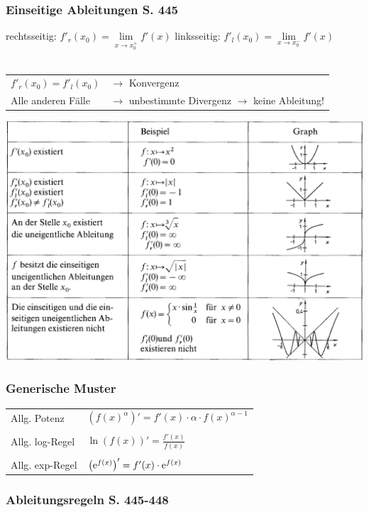 			
			\subsubsection{Einseitige Ableitungen S. 445}
			rechtsseitig: $f'_r(x_0) = \lim\limits_{x \to x_0^+}f'(x)$ \quad
			linksseitig: $f'_l(x_0) = \lim\limits_{x \to x_0^-}f'(x)$ \\
			\\
			\begin{tabular}{ll}
			$f'_r(x_0) = f'_l(x_0)$ & $\rightarrow$ Konvergenz \\
			Alle anderen Fälle & $\rightarrow$ unbestimmte Divergenz $\rightarrow$ keine Ableitung! \\
			\end{tabular}
			
			

		\includegraphics[width=0.9\linewidth]{Bilder/konvergenz-divergenz}
			
			
			\subsubsection{Generische Muster}
			\begin{tabular}{ll}
			Allg. Potenz &  $\left( f(x)^\alpha \right)' = f'(x) \cdot \alpha \cdot f(x) ^{\alpha - 1} $ \\
			\\
			Allg. log-Regel & $\ln \left( f(x) \right)' = \frac{f'(x)}{f(x)} $ \\
			\\
			Allg. exp-Regel & $ \left( \mathrm{e}^{f(x)} \right)' = f'(x) \cdot \mathrm{e}^{f(x)} $ \\
			\end{tabular}
			
			
			\subsubsection{Ableitungsregeln S. 445-448}
			
